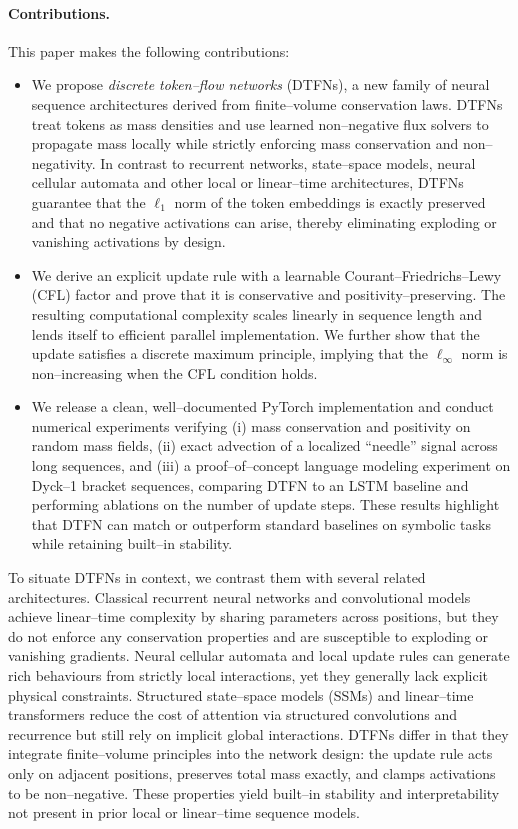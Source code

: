 \documentclass[10pt]{article}
\begin{document}
\paragraph{Contributions.}  This paper makes the following
contributions:
\begin{itemize}
  \item We propose \emph{discrete token--flow networks} (DTFNs), a new
  family of neural sequence architectures derived from finite--volume
  conservation laws.  DTFNs treat tokens as mass densities and use
  learned non--negative flux solvers to propagate mass locally while
  strictly enforcing mass conservation and non--negativity.  In
  contrast to recurrent networks, state--space models, neural cellular
  automata and other local or linear--time architectures, DTFNs
  guarantee that the $\ell_1$ norm of the token embeddings is exactly
  preserved and that no negative activations can arise, thereby
  eliminating exploding or vanishing activations by design.
  \item We derive an explicit update rule with a learnable Courant--Friedrichs--Lewy (CFL)
  factor and prove that it is conservative and positivity--preserving.  The
  resulting computational complexity scales linearly in sequence length and
  lends itself to efficient parallel implementation.  We further show
  that the update satisfies a discrete maximum principle, implying that
  the $\ell_\infty$ norm is non--increasing when the CFL condition holds.
  \item We release a clean, well--documented PyTorch implementation and conduct
  numerical experiments verifying (i) mass conservation and positivity on
  random mass fields, (ii) exact advection of a localized ``needle'' signal
  across long sequences, and (iii) a proof--of--concept language modeling
  experiment on Dyck--1 bracket sequences, comparing DTFN to an LSTM baseline and
  performing ablations on the number of update steps.
  These results highlight that DTFN can match or outperform
  standard baselines on symbolic tasks while retaining built--in stability.
\end{itemize}

To situate DTFNs in context, we contrast them with several related
architectures.  Classical recurrent neural networks and convolutional
models achieve linear--time complexity by sharing parameters across
positions, but they do not enforce any conservation properties and are
susceptible to exploding or vanishing gradients.  Neural cellular
automata and local update rules can generate rich behaviours from
strictly local interactions, yet they generally lack explicit physical
constraints.  Structured state--space models (SSMs) and
linear--time transformers reduce the cost of attention via structured
convolutions and recurrence but still rely on implicit global
interactions.  DTFNs differ in that they integrate finite--volume
principles into the network design: the update rule acts only on
adjacent positions, preserves total mass exactly, and clamps
activations to be non--negative.  These properties yield built--in
stability and interpretability not present in prior local or
linear--time sequence models.
\end{document}
